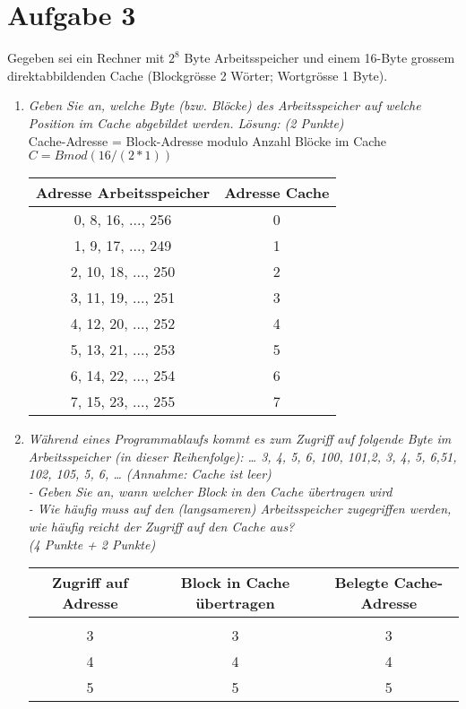 \documentclass[10pt]{article}
\begin{document}
\section*{Aufgabe 3}
Gegeben sei ein Rechner mit $2^8$ Byte Arbeitsspeicher und einem 16-Byte grossem direktabbildenden Cache (Blockgrösse 2 Wörter; Wortgrösse 1 Byte).
\begin{enumerate}[label=\alph*)]
	\item
		\textit{Geben Sie an, welche Byte (bzw. Blöcke) des Arbeitsspeicher auf	welche Position im Cache abgebildet werden.	Lösung: (2 Punkte)}\\
		Cache-Adresse = Block-Adresse modulo Anzahl Blöcke im Cache \\
		$C = B mod	(16/(2*1))$ \\
		\begin{tabular}{c | c}
		Adresse Arbeitsspeicher 	&	Adresse Cache \\
		\hline
		0, 8, 16, ..., 256	& 	0 \\
		1, 9, 17, ..., 249	& 	1 \\
		2, 10, 18, ...,	250	& 	2 \\
		3, 11, 19, ..., 251	&	3 \\
		4, 12, 20, ..., 252	& 	4 \\
		5, 13, 21, ..., 253	& 	5 \\
		6, 14, 22, ..., 254	&	6 \\
		7, 15, 23, ..., 255	&	7 \\
		\end{tabular}
	\item
		\textit{Während eines Programmablaufs kommt es zum Zugriff auf folgende Byte im Arbeitsspeicher (in dieser Reihenfolge): … 3, 4, 5, 6, 100, 101,2, 3, 4, 5, 6,51, 102, 105, 5, 6, … (Annahme: Cache ist leer) \\- Geben Sie an, wann welcher Block in den Cache übertragen wird \\- Wie häufig muss auf den (langsameren) Arbeitsspeicher zugegriffen werden, wie häufig reicht der Zugriff auf den Cache aus? \\(4 Punkte + 2 Punkte)}\\
		\begin{tabular}{c | c | c}
		Zugriff auf Adresse & Block in Cache übertragen & Belegte Cache-Adresse \\
		\hline\\
		3	& 	3 	& 3 \\
		4	&	4 	& 4 \\
		5	&	5 	& 5 \\

\end{tabular}
\end{enumerate}
\end{document}
